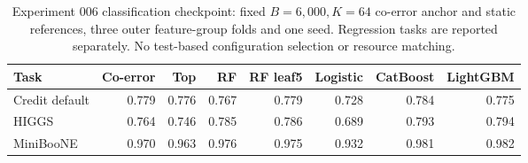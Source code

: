 \begin{table}[t]
\centering\small
\begin{tabular}{lrrrrrrr}
\toprule
Task & Co-error & Top & RF & RF leaf5 & Logistic & CatBoost & LightGBM \\
\midrule
Credit default & 0.779 & 0.776 & 0.767 & 0.779 & 0.728 & 0.784 & 0.775 \\
HIGGS & 0.764 & 0.746 & 0.785 & 0.786 & 0.689 & 0.793 & 0.794 \\
MiniBooNE & 0.970 & 0.963 & 0.976 & 0.975 & 0.932 & 0.981 & 0.982 \\
\bottomrule
\end{tabular}
\caption{Experiment 006 classification checkpoint: fixed $B=6,000,K=64$ co-error anchor and static references, three outer feature-group folds and one seed. Regression tasks are reported separately. No test-based configuration selection or resource matching.}
\end{table}
